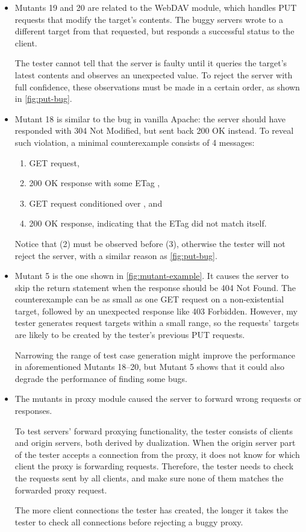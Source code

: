 \begin{itemize}
  \item Mutants 19 and 20 are related to the WebDAV module, which handles PUT
    requests that modify the target's contents.  The buggy servers wrote to a
    different target from that requested, but responds a successful status to
    the client.

    The tester cannot tell that the server is faulty until it queries the
    target's latest contents and observes an unexpected value.  To reject the
    server with full confidence, these observations must be made in a certain
    order, as shown in \autoref{fig:put-bug}.

  \item Mutant 18 is similar to the bug in vanilla Apache: the server should
    have responded with 304 Not Modified, but sent back 200 OK instead.  To
    reveal such violation, a minimal counterexample consists of 4 messages:
    \begin{enumerate}
    \item GET request,
    \item 200 OK response with some ETag ,
    \item GET request conditioned over , and
    \item 200 OK response, indicating that the ETag  did not match
      itself.
    \end{enumerate}
    Notice that (2) must be observed before (3), otherwise the tester will not
    reject the server, with a similar reason as \autoref{fig:put-bug}.

  \item Mutant 5 is the one shown in \autoref{fig:mutant-example}.  It causes
    the server to skip the return statement when the response should be 404 Not
    Found.  The counterexample can be as small as one GET request on a
    non-existential target, followed by an unexpected response like 403
    Forbidden.  However, my tester generates request targets within a small
    range, so the requests' targets are likely to be created by the tester's
    previous PUT requests.

    Narrowing the range of test case generation might improve the performance in
    aforementioned Mutants 18--20, but Mutant 5 shows that it could also degrade
    the performance of finding some bugs.

  \item The mutants in proxy module caused the server to forward wrong requests
    or responses.

    To test servers' forward proxying functionality, the tester consists of
    clients and origin servers, both derived by dualization.  When the origin
    server part of the tester accepts a connection from the proxy, it does not
    know for which client the proxy is forwarding requests.  Therefore, the
    tester needs to check the requests sent by all clients, and make sure none
    of them matches the forwarded proxy request.

    The more client connections the tester has created, the longer it takes the
    tester to check all connections before rejecting a buggy proxy.
\end{itemize}

